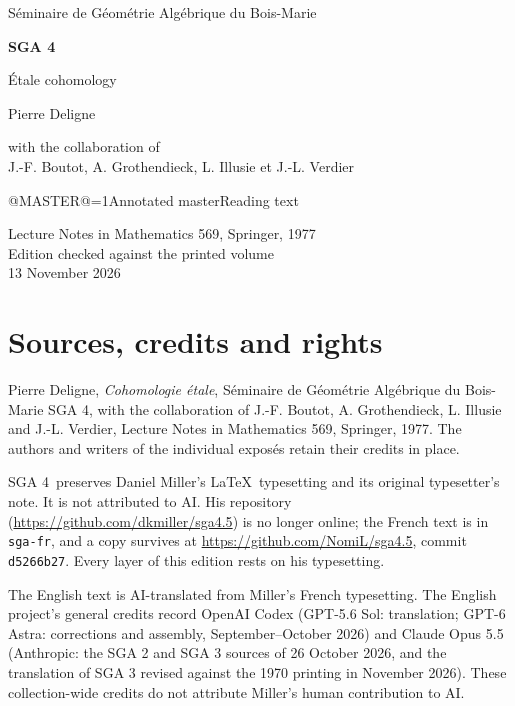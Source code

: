 \documentclass[oneside]{book}
\makeatletter
\theoremstyle{sga-source}
\theoremstyle{sga-source-dash}
\theoremstyle{sga-source-dotdash}
\theoremstyle{sga-source-number-note-dash}
\theoremstyle{sga-source-note-number-dotdash}
\theoremstyle{sga-source-example-dotdash}
\theoremstyle{sga-source-inline-number}
\theoremstyle{sga-source-bare-number}
\theoremstyle{sga-source}
\providecommand\EditionIsMaster{@MASTER@}
\makeatother
\begin{document}
\begin{titlepage}
\centering
\vspace*{2cm}
{\Large Séminaire de Géométrie Algébrique du Bois-Marie\par}
\vspace{0.7cm}
{\Huge\bfseries SGA 4\textonehalf\par}
\vspace{0.8cm}
{\huge Étale cohomology\par}
\vspace{1cm}
{\Large Pierre Deligne\par}
\vspace{0.5cm}
with the collaboration of\\[0.3em]
J.-F. Boutot, A. Grothendieck, L. Illusie et J.-L. Verdier
\vfill
{\Large \ifnum\EditionIsMaster=1\relax Annotated master\else Reading text\fi\par}
\vspace{0.7cm}
Lecture Notes in Mathematics 569, Springer, 1977\\[0.4em]
Edition checked against the printed volume\\
13 November 2026
\end{titlepage}

\chapter*{Sources, credits and rights}
Pierre Deligne, \emph{Cohomologie étale}, Séminaire de Géométrie Algébrique
du Bois-Marie SGA 4\textonehalf, with the collaboration of J.-F. Boutot,
A. Grothendieck, L. Illusie and J.-L. Verdier, Lecture Notes in Mathematics
569, Springer, 1977. The authors and writers of the individual exposés
retain their credits in place.

\medskip
SGA 4\textonehalf\ preserves Daniel Miller’s \LaTeX\ typesetting and its
original typesetter’s note. It is not attributed to AI. His repository
(\url{https://github.com/dkmiller/sga4.5}) is no longer online; the French
text is in \texttt{sga-fr}, and a copy survives at
\url{https://github.com/NomiL/sga4.5}, commit \texttt{d5266b27}.
Every layer of this edition rests on his typesetting.

\medskip
The English text is AI-translated from Miller’s French typesetting.
The English project’s general credits record OpenAI Codex (GPT-5.6 Sol:
translation; GPT-6 Astra: corrections and assembly, September--October
2026) and Claude Opus 5.5 (Anthropic: the SGA 2 and SGA 3 sources of
26 October 2026, and the translation of SGA 3 revised against the 1970
printing in November 2026). These collection-wide credits do not attribute
Miller’s human contribution to AI.
\end{document}
